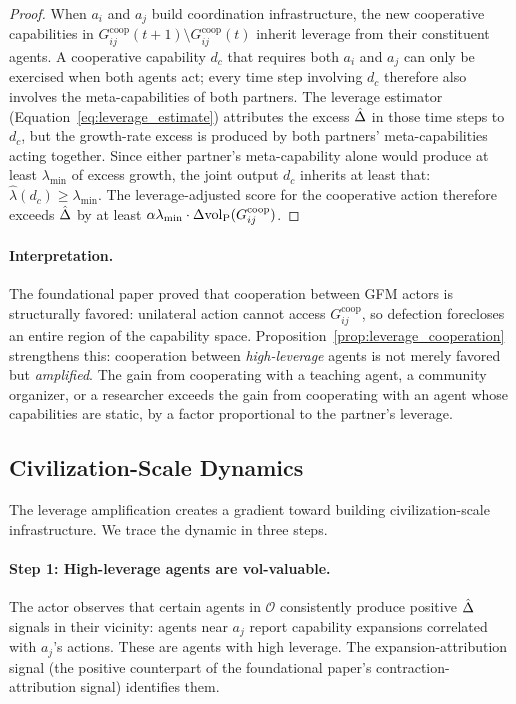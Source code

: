 \begin{proof}
When $a_i$ and $a_j$ build coordination infrastructure, the new cooperative
capabilities in $G^{\mathrm{coop}}_{ij}(t+1) \setminus G^{\mathrm{coop}}_{ij}(t)$
inherit leverage from their constituent agents. A cooperative capability $d_c$
that requires both $a_i$ and $a_j$ can only be exercised when both agents act;
every time step involving $d_c$ therefore also involves the meta-capabilities
of both partners. The leverage estimator
(Equation~\eqref{eq:leverage_estimate}) attributes the excess $\hat{\Delta}$ in
those time steps to $d_c$, but the growth-rate excess is produced by both
partners' meta-capabilities acting together. Since either partner's
meta-capability alone would produce at least $\lambda_{\min}$ of excess growth,
the joint output $d_c$ inherits at least that:
$\hat{\lambda}(d_c) \geq \lambda_{\min}$. The leverage-adjusted score
for the cooperative action therefore exceeds $\hat{\Delta}$ by at least
$\alpha \lambda_{\min} \cdot \Delta {\operatorname{vol}_{\mathrm{P}}}(G^{\mathrm{coop}}_{ij})$.
\end{proof}

\paragraph{Interpretation.} The foundational paper proved that cooperation
between GFM actors is structurally favored: unilateral action cannot access
$G^{\mathrm{coop}}_{ij}$, so defection forecloses an entire region of the
capability space. Proposition~\ref{prop:leverage_cooperation} strengthens this:
cooperation between \emph{high-leverage} agents is not merely favored but
\emph{amplified}. The gain from cooperating with a teaching agent, a
community organizer, or a researcher exceeds the gain from cooperating with
an agent whose capabilities are static, by a factor proportional to the
partner's leverage.

\subsection{Civilization-Scale Dynamics}
\label{sec:civilization}

The leverage amplification creates a gradient toward building civilization-scale
infrastructure. We trace the dynamic in three steps.

\paragraph{Step 1: High-leverage agents are vol-valuable.} The actor observes
that certain agents in $\mathcal{O}$ consistently produce positive $\hat{\Delta}$
signals in their vicinity: agents near $a_j$ report capability expansions
correlated with $a_j$'s actions. These are agents with high leverage. The
expansion-attribution signal (the positive counterpart of the foundational
paper's contraction-attribution signal) identifies them.


